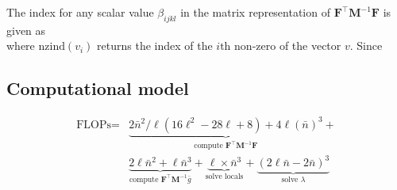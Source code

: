 The index for any scalar value $\beta_{i j k l}$ in the matrix representation of $\textbf{F}^{\intercal}\textbf{M}^{-1}\textbf{F}$ is given as 
\begin{equation}
[(N - 1) i + \text{nzind}(\textbf{f}^{\text{ind}}_{ij}) + l, (N - 1) i + \text{nzind}(\textbf{f}^{\text{ind}}_{ik}) + l]
\end{equation}
\noindent
where $\text{nzind}(v_i)$ returns the index of the $i\text{th}$ non-zero of the vector $v$. Since 

\subsection{Computational model}
\begin{equation}
\begin{split}
	\text{FLOPs} = & \underbrace{2\bar{n}^2/\ell (16\ell^2 - 28\ell + 8) + 4\ell(
	\bar{n})^3}_{\text{compute }\textbf{F}^{\intercal} \textbf{M}^{-1} \textbf{F}} + \\
	& \underbrace{2 \ell \bar{n}^2 + \ell \bar{n}^3}_{\text{compute }\textbf{F}^{\intercal} \textbf{M}^{-1} \bar{g}} 
	+ \underbrace{ \ell \times \bar{n}^3 }_{\text{solve locals}} 
	+ \underbrace{(2\ell \bar{n} - 2\bar{n})^3}_{\text{solve } \lambda} 
\end{split}
\end{equation}




